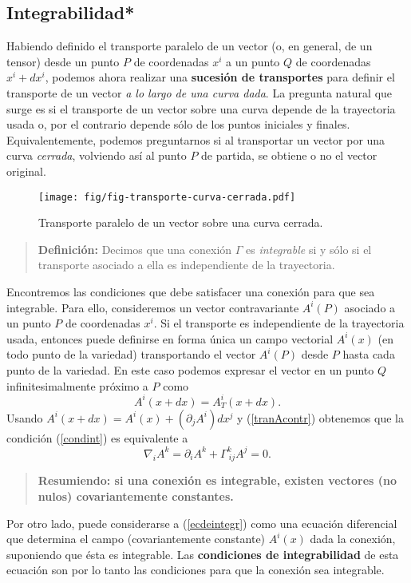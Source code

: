 \subsection{Integrabilidad*}\label{sec:integ}
Habiendo definido el transporte paralelo de un vector (o, en
general, de un tensor) desde un punto $P$
de coordenadas $x^i $ a un punto $Q$ de coordenadas $x^i +dx^i$, podemos
ahora realizar una \textbf{sucesión de transportes} para definir el transporte de un vector \textit{a lo largo de una curva dada}. La pregunta natural que surge es si el transporte de un vector sobre una curva depende de la trayectoria usada o, por el contrario depende sólo de los puntos iniciales y finales. Equivalentemente, podemos preguntarnos si al transportar un vector por una curva \textit{cerrada}, volviendo así al punto $P$ de partida, se obtiene o no el vector original.
\begin{center}
\begin{figure}[H]
\centerline{\texttt{[image: fig/fig-transporte-curva-cerrada.pdf]}}
\caption{Transporte paralelo de un vector sobre una curva cerrada.}
\label{dibujo}
\end{figure}
\end{center}
\begin{quotation}
\textbf{Definición:} Decimos que una conexión $\Gamma$ es \textit{integrable} si y sólo si el transporte asociado a ella es independiente de la trayectoria.
\end{quotation}
Encontremos las condiciones que debe satisfacer una conexión para que sea
integrable.
Para ello, consideremos un vector contravariante $A^i(P)$ asociado a un punto
$P$ de coordenadas $x^i$. Si el transporte es independiente de la trayectoria
usada, entonces puede definirse en forma única un campo vectorial $A^i(x)$ (en todo punto de la variedad) transportando el vector $A^i(P)$ desde $P$ hasta cada punto de la variedad. En este caso podemos expresar el vector en un punto $Q$ infinitesimalmente
próximo a $P$ como
\begin{equation}
A^i(x+dx)=A^i_T(x+dx) . \label{condint}
\end{equation}
Usando $A^i(x+dx)=A^i(x)+(\partial_j A^i)dx^j $ y (\ref{tranAcontr}) obtenemos que
la condición (\ref{condint}) es equivalente a
\begin{equation}
\nabla_i A^k=\partial_i A^k+\Gamma_{\ ij}^k A^j =0.
\label{ecdeintegr}%
\end{equation}
\begin{quotation}
\textbf{Resumiendo: si una conexión es integrable, existen vectores (no nulos) covariantemente constantes.}
\end{quotation}
Por otro lado, puede considerarse a (\ref{ecdeintegr}) como una ecuación
diferencial que determina el campo (covariantemente constante) $A^i(x)$ dada la conexión, suponiendo que ésta es integrable. Las \textbf{condiciones de
integrabilidad} de esta ecuación son por lo tanto las condiciones para que la
conexión sea integrable.


